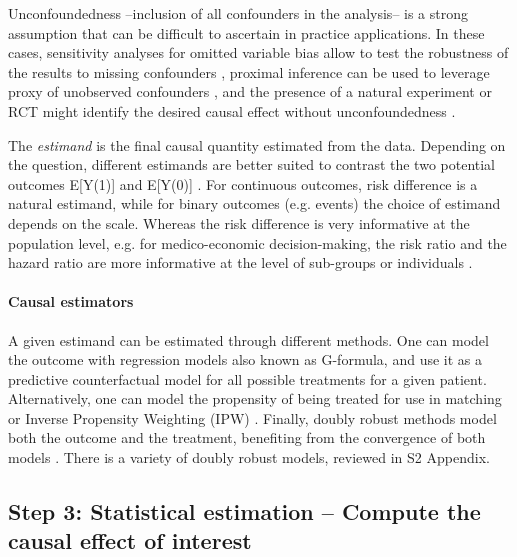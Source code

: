 \documentclass[10pt,letterpaper]{article}
\begin{document}
Unconfoundedness --inclusion of all confounders in the analysis-- is a strong
assumption that can be difficult to ascertain in practice applications. In these cases,
sensitivity analyses for omitted variable bias allow to test the robustness of
the results to missing confounders \cite{cinelli2020making}, proximal inference
can be used to leverage proxy of unobserved confounders
\cite{tchetgen2024introduction}, and the presence of a natural experiment or RCT might
identify the desired causal effect without unconfoundedness \cite[Chapter 5,
  9]{wager2020stats}.

The
\emph{estimand} is the final causal quantity estimated from the data.
Depending on the question, different estimands are better suited to contrast
the two potential outcomes E[Y(1)] and E[Y(0)] \cite{imbens_nonparametric_2004,colnet2023risk}. For continuous outcomes, risk
difference is a natural estimand, while for binary outcomes (e.g. events) the
choice of estimand depends on the scale. Whereas the risk difference is very
informative at the population level, e.g. for medico-economic decision-making,
the risk ratio and the hazard ratio are more informative at the level of
sub-groups or individuals \cite{colnet2023risk}.

\paragraph{Causal estimators}

A given estimand can be estimated through different methods. One can model the
outcome with regression models also known as
G-formula, \cite{robins1986role} and use it as a predictive counterfactual model
for all possible treatments for a given patient. Alternatively, one can model
the propensity of being treated for use in matching or Inverse Propensity
Weighting (IPW) \cite{austin2015moving}. Finally, doubly robust methods model
both the outcome and the treatment, benefiting from the convergence of both
models \cite{wager2020stats}. There is a variety of doubly robust models,
reviewed in S2 Appendix.

\subsection*{Step 3: Statistical estimation -- Compute the causal effect of interest}\label{sec:estimation}

%
\end{document}
